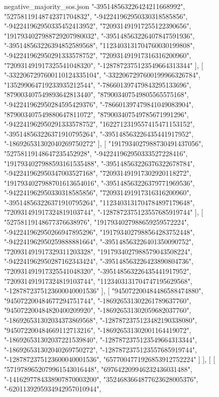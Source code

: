 \begin{filecontents*}[overwrite]{negative_majority_sos.json}
    "-395148563226424211668992",
    "52758119148742371704832",
    "-942241962950330318585856",
    "-942241962950335452413952",
    "720931491917255122390656",
    "1917934027988729207980032",
    "-395148563226407847591936",
    "-395148563226394852589568",
    "1123403131704760030199808",
    "-942241962950291333578752",
    "720931491917316316200960",
    "720931491917325541048320",
    "-1287872375123549664313344"
   ],
   [
    "-3322067297600110124335104",
    "-3322067297600199966326784",
    "135299064719233935212544",
    "-786601397479843295133696",
    "879003407549893642813440",
    "879003407549805565575168",
    "-942241962950284595429376",
    "-786601397479841049083904",
    "879003407549880647811072",
    "879003407549785671991296",
    "-942241962950291333578752",
    "1622712319557415471153152",
    "-395148563226371910795264",
    "-395148563226435441917952",
    "-186926531302040269750272"
   ],
   [
    "1917934027988730491437056",
    "52758119148647235452928",
    "-942241962950333527228416",
    "1917934027988593161535488",
    "-395148563226376322678784",
    "-942241962950347003527168",
    "720931491917302920118272",
    "1917934027988701613654016",
    "-395148563226379771969536",
    "-942241962950330318585856",
    "720931491917316316200960",
    "-395148563226371910795264",
    "1123403131704784897179648",
    "720931491917324819103744",
    "-1287872375123557685919744"
   ],
   [
    "52758119148677376638976",
    "1917934027988659259572224",
    "-942241962950266947895296",
    "1917934027988564283752448",
    "-942241962950259888881664",
    "-395148563226401350090752",
    "720931491917329311203328",
    "1917934027988579043508224",
    "-942241962950287162343424",
    "-395148563226423890804736",
    "720931491917325541048320",
    "-395148563226435441917952",
    "720931491917324819103744",
    "1123403131704747195629568",
    "-1287872375123600040001536"
   ],
   [
    "945072200484486588474880",
    "945072200484677294751744",
    "-186926531302261789637760",
    "945072200484820400209920",
    "-186926531302059682037760",
    "-186926531302034373869568",
    "-1287872375123482190338080",
    "945072200484669112713216",
    "-186926531302001164419072",
    "-186926531302037221539840",
    "-1287872375123549664313344",
    "-186926531302040269750272",
    "-1287872375123557685919744",
    "-1287872375123600040001536",
    "6577004771926853912752224"
   ]
  ],
  [
   [
    "5719789652079961543016448",
    "697642209946232436031488",
    "-1416297784338907870003200",
    "3524683664877623628005376",
    "-6201139295934942957010944",

\end{filecontents*}
